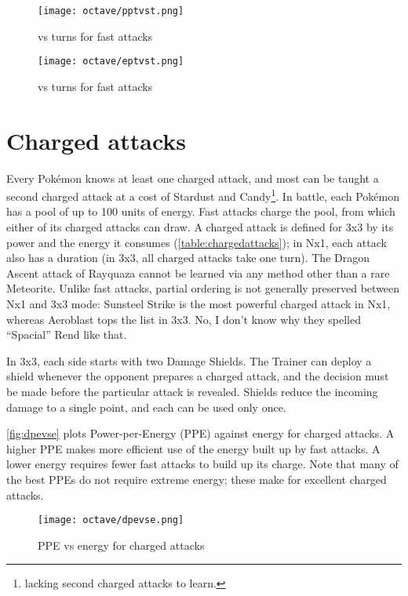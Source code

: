 \begin{figure}[ht]
\texttt{[image: octave/pptvst.png]}
  \caption{\PPT{} vs turns for fast attacks\label{fig:pptvst}}
\end{figure}

\begin{figure}[hb]
\texttt{[image: octave/eptvst.png]}
  \caption{\EPT{} vs turns for fast attacks\label{fig:eptvst}}
\end{figure}

\section{Charged attacks\label{sec:charged}}
Every Pokémon knows at least one charged attack, and most can be taught a second
  charged attack at a cost of Stardust and Candy\footnote{
  lacking second charged attacks to learn.}.
In battle, each Pokémon has a pool of up to 100 units of energy.
Fast attacks charge the pool, from which either of its charged attacks can draw.
A charged attack is defined for 3x3 by its power and the energy it consumes (\autoref{table:chargedattacks});
 in Nx1, each attack also has a duration (in 3x3, all charged attacks take one turn).
The Dragon Ascent attack of Rayquaza cannot be learned via any method other
  than a rare Meteorite.%
Unlike fast attacks, partial ordering is not generally preserved between Nx1 and 3x3 mode:
  Sunsteel Strike is the most powerful charged attack in Nx1, whereas Aeroblast tops
  the list in 3x3.
No, I don't know why they spelled ``Spacial'' Rend like that.


In 3x3, each side starts with two Damage Shields.
The Trainer can deploy a shield whenever the opponent prepares a charged attack,
   and the decision must be made before the particular attack is revealed.
Shields reduce the incoming damage to a single point, and each can be used only once.

\autoref{fig:dpevse} plots Power-per-Energy (PPE) against energy for charged attacks.
A higher PPE makes more efficient use of the energy built up by fast attacks.
A lower energy requires fewer fast attacks to build up its charge.
Note that many of the best PPEs do not require extreme energy; these make
 for excellent charged attacks.
\begin{figure}[ht]
\texttt{[image: octave/dpevse.png]}
  \caption{PPE vs energy for charged attacks\label{fig:dpevse}}
\end{figure}

